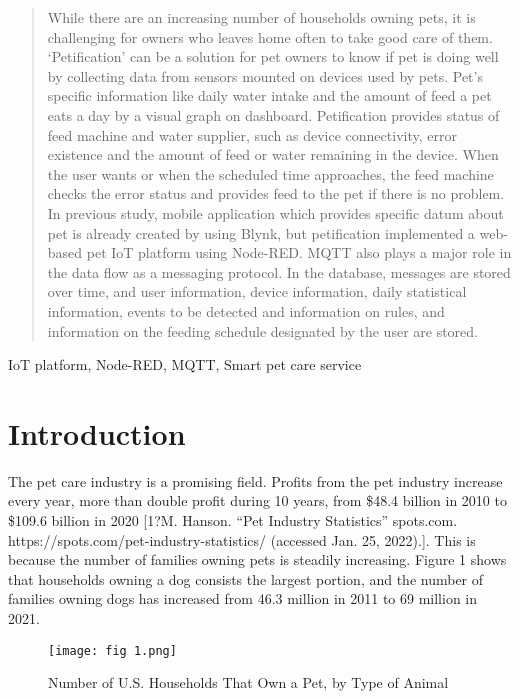 \documentclass[conference]{IEEEtran}
\begin{document}
\begin{abstract}
While there are an increasing number of households owning pets, it is challenging for owners who leaves home often to take good care of them. ‘Petification’ can be a solution for pet owners to know if pet is doing well by collecting data from sensors mounted on devices used by pets. Pet’s specific information like daily water intake and the amount of feed a pet eats a day by a visual graph on dashboard. Petification provides status of feed machine and water supplier, such as device connectivity, error existence and the amount of feed or water remaining in the device. When the user wants or when the scheduled time approaches, the feed machine checks the error status and provides feed to the pet if there is no problem. In previous study, mobile application which provides specific datum about pet is already created by using Blynk, but petification implemented a web-based pet IoT platform using Node-RED. MQTT also plays a major role in the data flow as a messaging protocol. In the database, messages are stored over time, and user information, device information, daily statistical information, events to be detected and information on rules, and information on the feeding schedule designated by the user are stored.
\end{abstract}
\hfill\break
\begin{IEEEkeywords}
IoT platform, Node-RED, MQTT, Smart pet care service 
\end{IEEEkeywords}
\section{Introduction}
The pet care industry is a promising field. Profits from the pet industry increase every year, more than double profit during 10 years, from \$48.4 billion in 2010 to \$109.6 billion in 2020 [1?M.  Hanson.  “Pet  Industry  Statistics”  spots.com.  https://spots.com/pet-industry-statistics/ (accessed Jan. 25, 2022).]. This is because the number of families owning pets is steadily increasing. Figure 1 shows that households owning a dog consists the largest portion, and the number of families owning dogs has increased from 46.3 million in 2011 to 69 million in 2021.

\begin{figure}[htbp]
\centerline{\texttt{[image: fig 1.png]}}
\caption{Number of U.S. Households That Own a Pet, by Type of Animal
}
\label{fig}
\end{figure}
\end{document}
